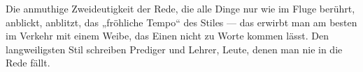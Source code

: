 Die anmuthige Zweideutigkeit der Rede, die alle Dinge nur wie im Fluge berührt, anblickt, anblitzt, das „fröhliche Tempo“ des Stiles — das erwirbt man am besten im Verkehr mit einem Weibe, das Einen nicht zu Worte kommen lässt. Den langweiligsten Stil schreiben Prediger und Lehrer, Leute, denen man nie in die Rede fällt.
\par

